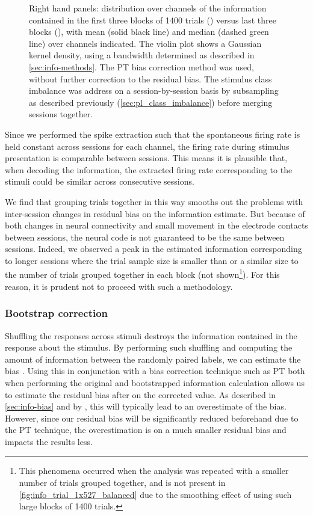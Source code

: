\begin{figure}[htbp]
{Right hand panels: distribution over channels of the information contained in the first three blocks of \num{1400} trials () versus last three blocks (), with mean (solid black line) and median (dashed green line) over channels indicated.
The violin plot shows a Gaussian kernel density, using a bandwidth determined as described in \autoref{sec:info-methods}.
The \ac{PT} bias correction method was used, without further correction to the residual bias.
The stimulus class imbalance was address on a session-by-session basis by subsampling as described previously (\autoref{sec:pl_class_imbalance}) before merging sessions together.
}
    \label{fig:info_trial_1x527_balanced}
\end{figure}


Since we performed the spike extraction such that the spontaneous firing rate is held constant across sessions for each channel, the firing rate during stimulus presentation is comparable between sessions.
This means it is plausible that, when decoding the information, the extracted firing rate corresponding to the stimuli could be similar across consecutive sessions.

We find that grouping trials together in this way smooths out the problems with inter-session changes in residual bias on the information estimate.
But because of both changes in neural connectivity and small movement in the electrode contacts between sessions, the neural code is not guaranteed to be the same between sessions.
Indeed, we observed a peak in the estimated information corresponding to longer sessions where the trial sample size is smaller than or a similar size to the number of trials grouped together in each block (not shown\footnote{This phenomena occurred when the analysis was repeated with a smaller number of trials grouped together, and is not present in \autoref{fig:info_trial_1x527_balanced} due to the smoothing effect of using such large blocks of \num{1400} trials.}).
For this reason, it is prudent not to proceed with such a methodology.


\subsubsection{Bootstrap correction}
\label{sec:pl_bootstrapping}

Shuffling the responses across stimuli destroys the information contained in the response about the stimulus.
By performing such shuffling and computing the amount of information between the randomly paired labels, we can estimate the bias \citep{Optican1991}.
Using this in conjunction with a bias correction technique such as \ac{PT} both when performing the original and bootstrapped information calculation allows us to estimate the residual bias after on the corrected value.
As described in \autoref{sec:info-bias} and by \citet{Panzeri1996}, this will typically lead to an overestimate of the bias.
However, since our residual bias will be significantly reduced beforehand due to the \ac{PT} technique, the overestimation is on a much smaller residual bias and impacts the results less.

